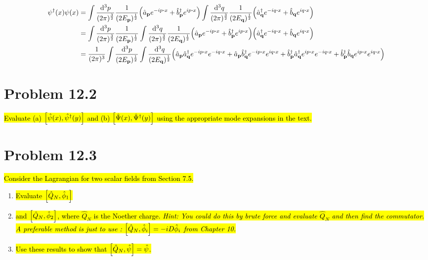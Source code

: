 \documentclass{article}
\begin{document}
\begin{align*}
    \psi^\dagger(x)\psi(x) & =\int \frac{\dd[3]{p}}{(2\pi)^\frac{3}{2}}  \frac{1}{(2E_{\vb{p}})^{\frac{1}{2}}}  \pqty{\hat{a}_{\vb{p}}e^{-ip\vdot x}+\hat{b}^\dagger_{\vb{p}}e^{ip\vdot x}}    \int \frac{\dd[3]{q}}{(2\pi)^\frac{3}{2}}  \frac{1}{(2E_{\vb{q}})^{\frac{1}{2}}}  \pqty{\hat{a}^\dagger_{\vb{q}}e^{-iq\vdot x}+\hat{b}_{\vb{q}}e^{iq\vdot x}}                                                                                             \\
                           & =\int \frac{\dd[3]{p}}{(2\pi)^\frac{3}{2}}  \frac{1}{(2E_{\vb{p}})^{\frac{1}{2}}} \int \frac{\dd[3]{q}}{(2\pi)^\frac{3}{2}}  \frac{1}{(2E_{\vb{q}})^{\frac{1}{2}}} \pqty{\hat{a}_{\vb{p}}e^{-ip\vdot x}+\hat{b}^\dagger_{\vb{p}}e^{ip\vdot x}}      \pqty{\hat{a}^\dagger_{\vb{q}}e^{-iq\vdot x}+\hat{b}_{\vb{q}}e^{iq\vdot x}}                                                                                             \\
                           & =\frac{1}{(2\pi)^3}\int   \frac{\dd[3]{p}}{(2E_{\vb{p}})^{\frac{1}{2}}} \int   \frac{\dd[3]{q}}{(2E_{\vb{q}})^{\frac{1}{2}}} \pqty{\hat{a}_{\vb{p}}\hat{a}^\dagger_{\vb{q}}e^{-ip\vdot x}e^{-iq\vdot x}+\hat{a}_{\vb{p}}\hat{b}^\dagger_{\vb{q}}e^{-ip\vdot x}e^{iq\vdot x}+\hat{b}^\dagger_{\vb{p}}\hat{a}^\dagger_{\vb{q}}e^{ip\vdot x}e^{-iq\vdot x}+\hat{b}^\dagger_{\vb{p}}\hat{b}_{\vb{q}}e^{ip\vdot x}e^{iq\vdot x}} \\
\end{align*}

\section*{Problem 12.2}
\begin{quoting}
    \hl{Evaluate (a) $\bqty{\hat{\psi}(x),\hat{\psi}^\dagger (y)}$ and (b) $\bqty{\hat{\Psi}(x),\hat{\Psi}^\dagger (y)}$ using the appropriate mode expansions in the text.}
\end{quoting}


\section*{Problem 12.3}
\begin{quoting}
    \hl{Consider the Lagrangian for two scalar fields from Section 7.5.}
    \begin{enumerate}[label=(\alph*)]
        \item \hl{Evaluate $\bqty{\hat{Q}_N,\hat{\phi}_1}$}
        \item \hl{and $\bqty{\hat{Q}_N,\hat{\phi}_2}$, where $\hat{Q}_N$ is the Noether charge. \emph{Hint: You could do this by brute force and evaluate $\hat{Q}_N$ and then find the commutator. A preferable method is just to use : $\bqty{\hat{Q}_N,\hat{\phi}_i}=-iD\hat{\phi}_i$ from Chapter 10.}}
        \item \hl{Use these results to show that $\bqty{\hat{Q}_N,\hat{\psi}}=\hat{\psi}$.}
    \end{enumerate}
\end{quoting}
\end{document}
